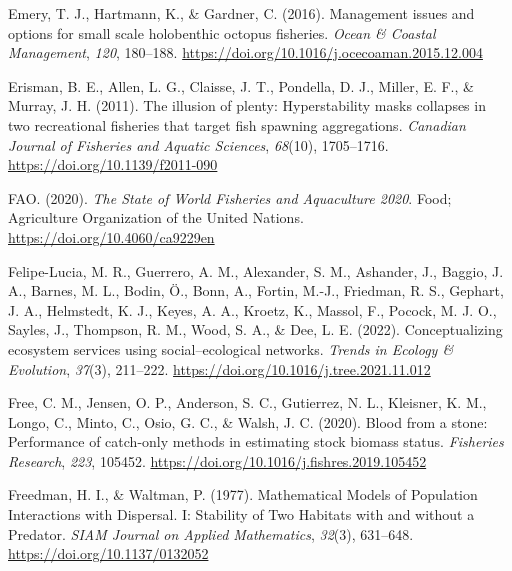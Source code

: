 \documentclass[
  12pt,
]{article}
\newlength{\cslhangindent}
\newlength{\cslentryspacingunit} %
\newenvironment{CSLReferences}[2] %
 {%
  \setlength{\parindent}{0pt}
  \ifodd #1
  \let\oldpar\par
  \def\par{\hangindent=\cslhangindent\oldpar}
  \fi
  \setlength{\parskip}{#2\cslentryspacingunit}
 }%
 {}
\begin{document}
\begin{CSLReferences}{1}{2}
\leavevmode{}%
Emery, T. J., Hartmann, K., \& Gardner, C. (2016). Management issues and options for small scale holobenthic octopus fisheries. \emph{Ocean \& Coastal Management}, \emph{120}, 180--188. \url{https://doi.org/10.1016/j.ocecoaman.2015.12.004}

\leavevmode{}%
Erisman, B. E., Allen, L. G., Claisse, J. T., Pondella, D. J., Miller, E. F., \& Murray, J. H. (2011). The illusion of plenty: Hyperstability masks collapses in two recreational fisheries that target fish spawning aggregations. \emph{Canadian Journal of Fisheries and Aquatic Sciences}, \emph{68}(10), 1705--1716. \url{https://doi.org/10.1139/f2011-090}

\leavevmode{}%
FAO. (2020). \emph{The {State} of {World} {Fisheries} and {Aquaculture} 2020}. Food; Agriculture Organization of the United Nations. \url{https://doi.org/10.4060/ca9229en}

\leavevmode{}%
Felipe-Lucia, M. R., Guerrero, A. M., Alexander, S. M., Ashander, J., Baggio, J. A., Barnes, M. L., Bodin, Ö., Bonn, A., Fortin, M.-J., Friedman, R. S., Gephart, J. A., Helmstedt, K. J., Keyes, A. A., Kroetz, K., Massol, F., Pocock, M. J. O., Sayles, J., Thompson, R. M., Wood, S. A., \& Dee, L. E. (2022). Conceptualizing ecosystem services using social--ecological networks. \emph{Trends in Ecology \& Evolution}, \emph{37}(3), 211--222. \url{https://doi.org/10.1016/j.tree.2021.11.012}

\leavevmode{}%
Free, C. M., Jensen, O. P., Anderson, S. C., Gutierrez, N. L., Kleisner, K. M., Longo, C., Minto, C., Osio, G. C., \& Walsh, J. C. (2020). Blood from a stone: {Performance} of catch-only methods in estimating stock biomass status. \emph{Fisheries Research}, \emph{223}, 105452. \url{https://doi.org/10.1016/j.fishres.2019.105452}

\leavevmode{}%
Freedman, H. I., \& Waltman, P. (1977). Mathematical {Models} of {Population} {Interactions} with {Dispersal}. {I}: {Stability} of {Two} {Habitats} with and without a {Predator}. \emph{SIAM Journal on Applied Mathematics}, \emph{32}(3), 631--648. \url{https://doi.org/10.1137/0132052}


\end{CSLReferences}
\end{document}
